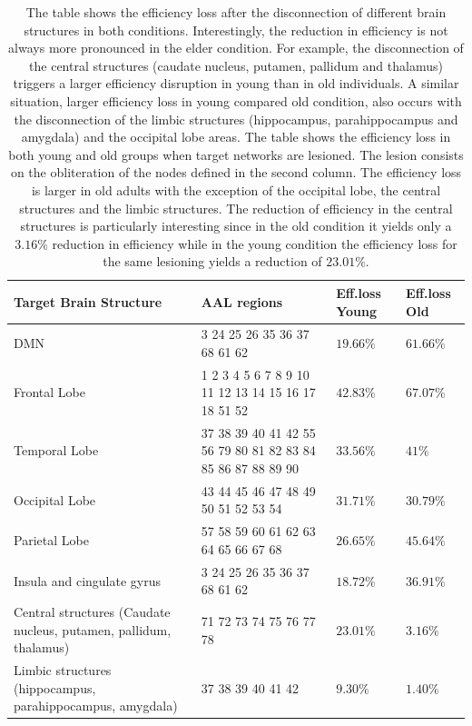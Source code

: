 \documentclass[12pt,a4paper]{article}
\begin{document}
\begin{table}[!htbp]
\centering%

\newpage
\begin{tabularx}{\linewidth}{XXXX}
\toprule
Target Brain Structure & AAL regions & Eff.loss Young &Eff.loss Old\\
\midrule
\midrule
DMN & 3 24 25 26 35 36 37 68 61 62 & $19.66\%$& $61.66\%$\\
\midrule
Frontal Lobe & 1 2 3 4 5 6 7 8 9 10 11 12 13 14 15 16 17 18 51 52 & $42.83\%$& $67.07\%$\\
\midrule
  Temporal Lobe & 37 38 39 40 41 42 55 56 79 80 81 82 83 84 85 86 87 88 89 90 & $33.56\%$& $41\%$\\
      \midrule
      Occipital Lobe & 43 44 45 46 47 48 49 50 51 52 53 54 & $31.71\%$& $30.79\%$\\
	 \midrule      
	 Parietal Lobe & 57 58 59 60 61 62 63 64 65 66 67 68 & $26.65\%$& $45.64\%$\\
	\midrule      
	Insula and cingulate gyrus & 3 24 25 26 35 36 37 68 61 62 & $18.72\%$& $36.91\%$\\
   \midrule     
    Central structures (Caudate nucleus, putamen, pallidum, thalamus) & 71 72 73 74 75 76 77 78 & $23.01\%$& $3.16\%$\\
     \midrule 
     Limbic structures (hippocampus, parahippocampus, amygdala) & 37 38 39 40 41 42 & $9.30\%$& $1.40\%$\\
     \bottomrule
\end{tabularx}
\caption{The table shows the efficiency loss after the disconnection of different brain structures in both conditions. Interestingly, the reduction in efficiency is not always more pronounced in the elder condition. For example, the disconnection of the central structures (caudate nucleus, putamen, pallidum and thalamus) triggers a larger efficiency disruption in young than in old individuals. A similar situation, larger efficiency loss in young compared old condition, also occurs with the disconnection of the limbic structures (hippocampus, parahippocampus and amygdala) and the occipital lobe areas. The table shows the efficiency loss in both young and old groups when target networks are lesioned. The lesion consists on the obliteration of the nodes defined in the second column. The efficiency loss is larger in old adults with the exception of the occipital lobe, the central structures and the limbic structures. The reduction of efficiency in the central structures is particularly interesting since in the old condition it yields only a $3.16\%$ reduction in efficiency while in the young condition the efficiency loss for the same lesioning yields a reduction of $23.01\%$.}
\label{tab:nodesn}
\end{table}
\end{document}
